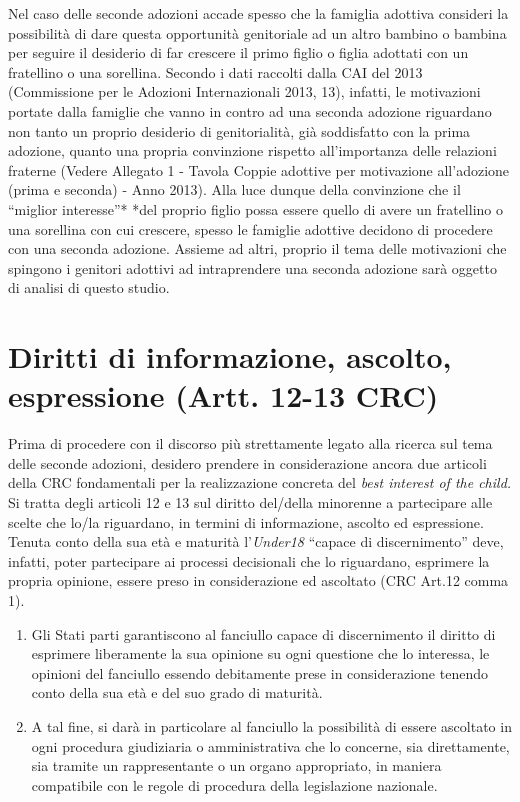 \documentclass[12pt,oneside,svgnames]{memoir}
\begin{document}
Nel caso delle seconde adozioni accade spesso che la famiglia adottiva
consideri la possibilità di dare questa opportunità genitoriale ad un
altro bambino o bambina per seguire il desiderio di far crescere il
primo figlio o figlia adottati con un fratellino o una sorellina.
Secondo i dati raccolti dalla CAI del 2013 (Commissione per le Adozioni
Internazionali 2013, 13), infatti, le motivazioni portate dalla famiglie
che vanno in contro ad una seconda adozione riguardano non tanto un
proprio desiderio di genitorialità, già soddisfatto con la prima
adozione, quanto una propria convinzione rispetto all'importanza delle
relazioni fraterne (Vedere Allegato 1 - Tavola Coppie adottive per
motivazione all'adozione (prima e seconda) - Anno 2013). Alla luce
dunque della convinzione che il ``miglior interesse''* *del proprio
figlio possa essere quello di avere un fratellino o una sorellina con
cui crescere, spesso le famiglie adottive decidono di procedere con una
seconda adozione. Assieme ad altri, proprio il tema delle motivazioni
che spingono i genitori adottivi ad intraprendere una seconda adozione
sarà oggetto di analisi di questo studio.

\section{Diritti di informazione, ascolto, espressione (Artt. 12-13
CRC)}\label{diritti-di-informazione-ascolto-espressione-artt.-12-13-crc}

Prima di procedere con il discorso più strettamente legato alla ricerca
sul tema delle seconde adozioni, desidero prendere in considerazione
ancora due articoli della CRC fondamentali per la realizzazione concreta
del \emph{best interest of the child.} Si tratta degli articoli 12 e 13
sul diritto del/della minorenne a partecipare alle scelte che lo/la
riguardano, in termini di informazione, ascolto ed espressione. Tenuta
conto della sua età e maturità l'\emph{Under18} ``capace di
discernimento'' deve, infatti, poter partecipare ai processi decisionali
che lo riguardano, esprimere la propria opinione, essere preso in
considerazione ed ascoltato (CRC Art.12 comma 1).

\begin{enumerate}
\def\labelenumi{\arabic{enumi}.}
\item
  Gli Stati parti garantiscono al fanciullo capace di discernimento il
  diritto di esprimere liberamente la sua opinione su ogni questione che
  lo interessa, le opinioni del fanciullo essendo debitamente prese in
  considerazione tenendo conto della sua età e del suo grado di
  maturità.
\item
  A tal fine, si darà in particolare al fanciullo la possibilità di
  essere ascoltato in ogni procedura giudiziaria o amministrativa che lo
  concerne, sia direttamente, sia tramite un rappresentante o un organo
  appropriato, in maniera compatibile con le regole di procedura della
  legislazione nazionale.
\end{enumerate}
\end{document}
